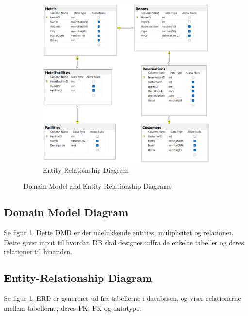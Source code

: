 \begin{figure}
\begin{subfigure}[b]{0.45\textwidth}
        \includegraphics[width=\textwidth]{figures/SWD_ERD_HotelManagement.png}
        \caption{Entity Relationship Diagram}\label{EntityRelationDiagram}
    \end{subfigure}
    \caption{Domain Model and Entity Relationship Diagrams}
\end{figure}

\subsection{Domain Model Diagram}
Se figur 1. Dette DMD er der udelukkende entities, muliplicitet og relationer.
Dette giver input til hvordan DB skal designes udfra de enkelte tabeller og deres relationer til hinanden.

\subsection{Entity-Relationship Diagram}
Se figur 1. ERD er genereret ud fra tabellerne i databasen, og viser relationerne mellem tabellerne, deres PK, FK og datatype.